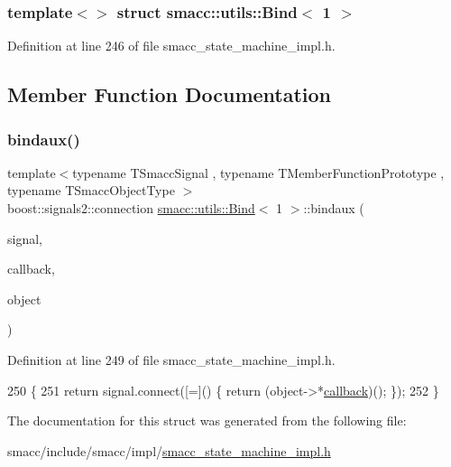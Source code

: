 \subsubsection*{template$<$$>$\newline
struct smacc\+::utils\+::\+Bind$<$ 1 $>$}



Definition at line 246 of file smacc\+\_\+state\+\_\+machine\+\_\+impl.\+h.



\subsection{Member Function Documentation}
\mbox{\label{structsmacc_1_1utils_1_1Bind_3_011_01_4_a5704d3cff0b914fc899ff385ff8f8bc2}} 
\subsubsection{\texorpdfstring{bindaux()}{bindaux()}}
{\footnotesize\ttfamily template$<$typename T\+Smacc\+Signal , typename T\+Member\+Function\+Prototype , typename T\+Smacc\+Object\+Type $>$ \\
boost\+::signals2\+::connection \hyperlink{structsmacc_1_1utils_1_1Bind}{smacc\+::utils\+::\+Bind}$<$ 1 $>$\+::bindaux (\begin{DoxyParamCaption}\item[{T\+Smacc\+Signal \&}]{signal,  }\item[{T\+Member\+Function\+Prototype}]{callback,  }\item[{T\+Smacc\+Object\+Type $\ast$}]{object }\end{DoxyParamCaption})\hspace{0.3cm}{\ttfamily [inline]}}



Definition at line 249 of file smacc\+\_\+state\+\_\+machine\+\_\+impl.\+h.


\begin{DoxyCode}
250   \{
251     \textcolor{keywordflow}{return} signal.connect([=]() \{ \textcolor{keywordflow}{return} (object->*\hyperlink{servers_2opencv__perception__node_2opencv__perception__node_8cpp_a050e697bd654facce10ea3f6549669b3}{callback})(); \});
252   \}
\end{DoxyCode}


The documentation for this struct was generated from the following file\+:\begin{DoxyCompactItemize}
\item 
smacc/include/smacc/impl/\hyperlink{smacc__state__machine__impl_8h}{smacc\+\_\+state\+\_\+machine\+\_\+impl.\+h}\end{DoxyCompactItemize}
